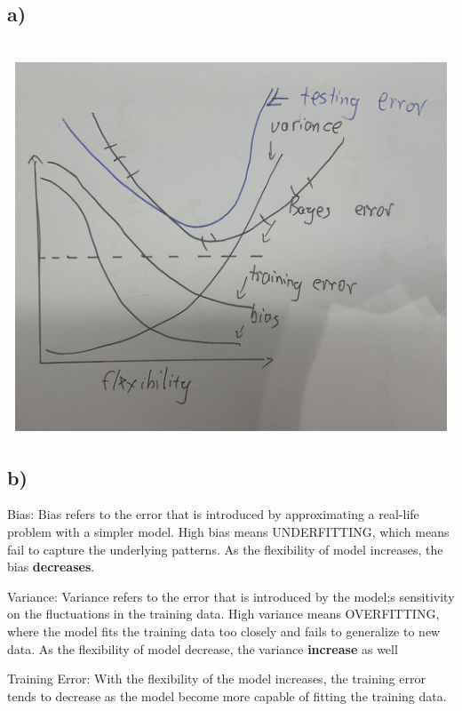 \documentclass[
]{article}
\begin{document}
\hypertarget{a-2}{%
\subsection{a)}\label{a-2}}

\hypertarget{section}{%
\section{\texorpdfstring{\protect\includegraphics[width=8.41667in,height=4.32292in]{images/C2E3a.jpeg}}{}}\label{section}}

\hypertarget{b-2}{%
\subsection{b)}\label{b-2}}

Bias: Bias refers to the error that is introduced by approximating a
real-life problem with a simpler model. High bias means UNDERFITTING,
which means fail to capture the underlying patterns. As the flexibility
of model increases, the bias \textbf{decreases}.

Variance: Variance refers to the error that is introduced by the model;s
sensitivity on the fluctuations in the training data. High variance
means OVERFITTING, where the model fits the training data too closely
and fails to generalize to new data. As the flexibility of model
decrease, the variance \textbf{increase} as well

Training Error: With the flexibility of the model increases, the
training error tends to decrease as the model become more capable of
fitting the training data.
\end{document}
